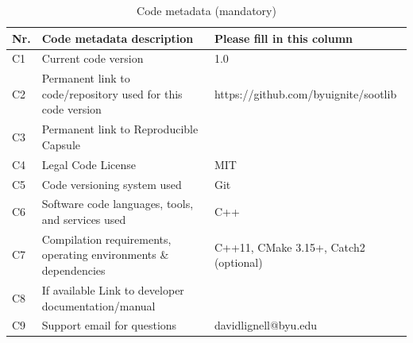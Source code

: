 \documentclass[preprint,letterpaper]{elsarticle}
\begin{document}
\begin{table}
\begin{tabular}{|l|p{6.5cm}|p{6.5cm}|}
\hline
\textbf{Nr.} & \textbf{Code metadata description} & \textbf{Please fill in this column} \\
\hline
C1 & Current code version & 1.0 \\
\hline
C2 & Permanent link to code/repository used for this code version & https://github.com/byuignite/sootlib \\
\hline
C3  & Permanent link to Reproducible Capsule & \\
\hline
C4 & Legal Code License & MIT \\
\hline
C5 & Code versioning system used & Git \\
\hline
C6 & Software code languages, tools, and services used & C++ \\
\hline
C7 & Compilation requirements, operating environments \& dependencies & C++11, CMake 3.15+, Catch2 (optional) \\
\hline
C8 & If available Link to developer documentation/manual &  \\
\hline
C9 & Support email for questions & davidlignell@byu.edu \\
\hline
\end{tabular}
\caption{Code metadata (mandatory)}
\end{table}

%
%
\end{document}
